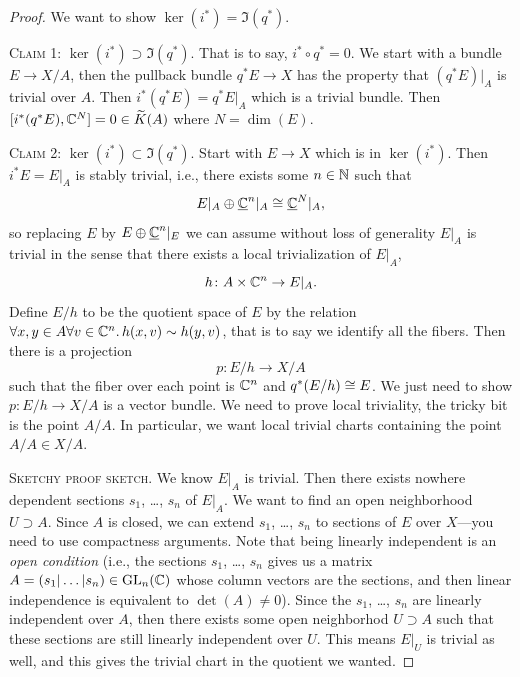 \begin{proof}
We want to show $\ker(i^{*})=\Im(q^{*})$.

\textsc{Claim 1}: $\ker(i^{*})\supset\Im(q^{*})$. That is to say,
$i^{*}\circ q^{*}=0$. We start with a bundle $E\to X/A$, then the
pullback bundle $q^{*}E\to X$ has the property that $(q^{*}E)|_{A}$ is
trivial over $A$. Then $i^{*}(q^{*}E)=q^{*}E|_{A}$ which is a trivial
bundle. Then $[i^{*}(q^{*}E),\mathbb{C}^{N}]=0\in\widetilde{K}(A)$ where $N=\dim(E)$.

\textsc{Claim 2}: $\ker(i^{*})\subset\Im(q^{*})$. Start with $E\to X$
which is in $\ker(i^{*})$. Then $i^{*}E=E|_{A}$ is stably trivial,
i.e., there exists some $n\in\mathbb{N}$ such that
\begin{equation}
E|_{A}\oplus\underline{\mathbb{C}}^{n}|_{A}\cong\underline{\mathbb{C}}^{N}|_{A},
\end{equation}
so replacing $E$ by $E\oplus\underline{\mathbb{C}}^{n}|_{E}$ we can
assume without loss of generality $E|_{A}$ is trivial in the sense
that there exists a local trivialization of $E|_{A}$,
\begin{equation}
h\colon A\times\mathbb{C}^{n}\to E|_{A}.
\end{equation}
Define $E/h$ to be the quotient space of $E$ by the relation
$\forall x,y\in A\forall v\in\mathbb{C}^{n}\ldotp h(x,v)\sim h(y,v)$,
that is to say we identify all the fibers. Then there is a projection
\begin{equation}
p\colon E/h\to X/A
\end{equation}
such that the fiber over each point is $\mathbb{C}^{n}$ and $q^{*}(E/h)\cong E$.
We just need to show $p\colon E/h\to X/A$ is a vector bundle. We need
to prove local triviality, the tricky bit is the point $A/A$. In
particular, we want local trivial charts containing the point $A/A\in X/A$.

\textsc{Sketchy proof sketch}. We know $E|_{A}$ is trivial. Then there
exists nowhere dependent sections $s_{1}$, \dots, $s_{n}$ of
$E|_{A}$. We want to find an open neighborhood $U\supset A$. Since $A$
is closed, we can extend $s_{1}$, \dots, $s_{n}$ to sections of $E$
over $X$---you need to use compactness arguments. Note that being
linearly independent is an \emph{open condition} (i.e., the sections
$s_{1}$, \dots, $s_{n}$ gives us a matrix
$A=(s_{1}|\dots|s_{n})\in\operatorname{GL}_{n}(\mathbb{C})$ whose column vectors are the
sections, and then linear independence is equivalent to $\det(A)\neq0$).
Since the $s_{1}$, \dots, $s_{n}$ are linearly independent over $A$,
then there exists some open neighborhod $U\supset A$ such that these
sections are still linearly independent over $U$. This means $E|_{U}$
is trivial as well, and this gives the trivial chart in the quotient
we wanted.
\end{proof}

